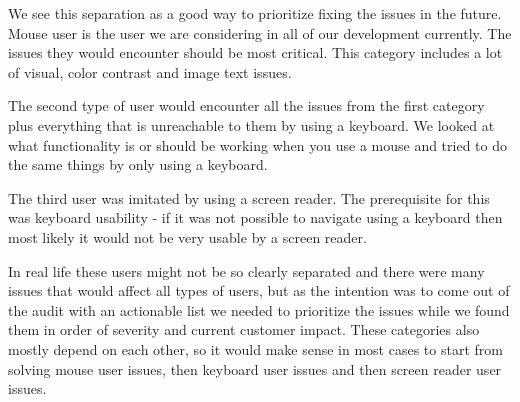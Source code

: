 \documentclass{master_thesis}
\begin{document}
We see this separation as a good way to prioritize  fixing the issues in the future. Mouse user is the user we are considering in all of our development currently. The issues they would encounter should be most critical. This category includes a lot of visual, color contrast and image text issues.

The second type of user would encounter all the issues from the first category plus everything that is unreachable to them by using a keyboard. We looked at what functionality is or should be working when you use a mouse and tried to do the same things by only using a keyboard.

The third user was imitated by using a screen reader. The prerequisite for this was keyboard usability - if it was not possible to navigate using a keyboard then most likely it would not be very usable by a screen reader.

In real life these users might not be so clearly separated and there were many issues that would affect all types of users, but as the intention was to come out of the audit with an actionable list we needed to prioritize the issues while we found them in order of severity and current customer impact. These categories also mostly depend on each other, so it would make sense in most cases to start from solving mouse user issues, then keyboard user issues and then screen reader user issues.
\end{document}
